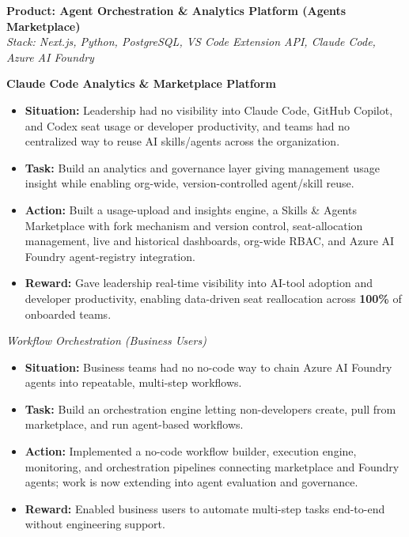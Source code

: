 \documentclass[a4paper,10pt]{article}
\newcommand{\expblock}[1]{\noindent\textbf{#1}\par\vspace{1pt}}
\newcommand{\expsubblock}[1]{\noindent\textit{#1}\par\vspace{1pt}}
\begin{document}
\vspace{10pt}
\noindent\textbf{Product: Agent Orchestration \& Analytics Platform (Agents Marketplace)}\\
\textit{Stack: Next.js, Python, PostgreSQL, VS Code Extension API, Claude Code, Azure AI Foundry}

\vspace{4pt}
\expblock{Claude Code Analytics \& Marketplace Platform}
\begin{itemize}
\item \textbf{Situation:} Leadership had no visibility into Claude Code, GitHub Copilot, and Codex seat usage or developer productivity, and teams had no centralized way to reuse AI skills/agents across the organization.
\item \textbf{Task:} Build an analytics and governance layer giving management usage insight while enabling org-wide, version-controlled agent/skill reuse.
\item \textbf{Action:} Built a usage-upload and insights engine, a Skills \& Agents Marketplace with fork mechanism and version control, seat-allocation management, live and historical dashboards, org-wide RBAC, and Azure AI Foundry agent-registry integration.
\item \textbf{Reward:} Gave leadership real-time visibility into AI-tool adoption and developer productivity, enabling data-driven seat reallocation across \textbf{100\%} of onboarded teams.
\end{itemize}

\vspace{4pt}
\expsubblock{Workflow Orchestration (Business Users)}
\begin{itemize}
\item \textbf{Situation:} Business teams had no no-code way to chain Azure AI Foundry agents into repeatable, multi-step workflows.
\item \textbf{Task:} Build an orchestration engine letting non-developers create, pull from marketplace, and run agent-based workflows.
\item \textbf{Action:} Implemented a no-code workflow builder, execution engine, monitoring, and orchestration pipelines connecting marketplace and Foundry agents; work is now extending into agent evaluation and governance.
\item \textbf{Reward:} Enabled business users to automate multi-step tasks end-to-end without engineering support.
\end{itemize}
\end{document}
